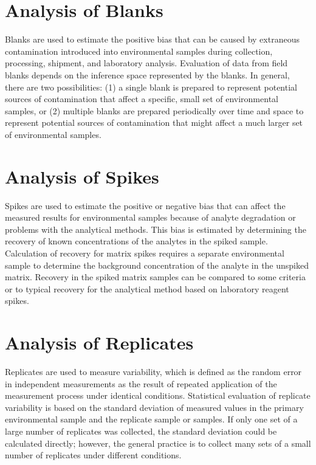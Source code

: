 \documentclass{article}
\begin{document}
\eject
\section{Analysis of Blanks} 

Blanks are used to estimate the positive bias that can be caused by extraneous contamination introduced into environmental samples during collection, processing, shipment, and laboratory analysis. Evaluation of data from field blanks depends on the inference space represented by the blanks. In general, there are two possibilities: (1) a single blank is prepared to represent potential sources of contamination that affect a specific, small set of environmental samples, or (2) multiple blanks are prepared periodically over time and space to represent potential sources of contamination that might affect a much larger set of environmental samples.

\eject
\section{Analysis of Spikes} 

Spikes are used to estimate the positive or negative bias that can affect the measured results for environmental samples because of analyte degradation or problems with the analytical methods. This bias is estimated by determining the recovery of known concentrations of the analytes in the spiked sample. Calculation of recovery for matrix spikes requires a separate environmental sample to determine the background concentration of the analyte in the unspiked matrix. Recovery in the spiked matrix samples can be compared to some criteria or to typical recovery for the analytical method based on laboratory reagent spikes.

\eject
\section{Analysis of Replicates} 

Replicates are used to measure variability, which is defined as the random error in independent measurements as the result of repeated application of the measurement process under identical conditions. Statistical evaluation of replicate variability is based on the standard deviation of measured values in the primary environmental sample and the replicate sample or samples. If only one set of a large number of replicates was collected, the standard deviation could be calculated directly; however, the general practice is to collect many sets of a small number of replicates under different conditions.
\end{document}
